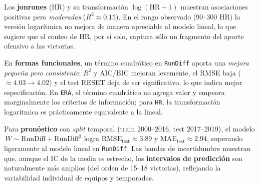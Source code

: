 \documentclass[man,floatsintext]{apa7}
\begin{document}
Los \textbf{jonrones} (HR) y su transformación \(\log(\text{HR}+1)\) muestran asociaciones positivas pero \textit{moderadas} (\(R^2\approx 0.15\)). En el rango observado (90–300 HR) la versión logarítmica no mejora de manera apreciable al modelo lineal, lo que sugiere que el conteo de HR, por sí solo, captura sólo un fragmento del aporte ofensivo a las victorias.

En \textbf{formas funcionales}, un término cuadrático en \texttt{RunDiff} aporta una \textit{mejora pequeña pero consistente}: \(R^2\) y AIC/BIC mejoran levemente, el RMSE baja (\(\approx 4.03 \rightarrow 4.02\)) y el test RESET deja de ser significativo, lo que indica mejor especificación. En \texttt{ERA}, el término cuadrático no agrega valor y empeora marginalmente los criterios de información; para \texttt{HR}, la transformación logarítmica es prácticamente equivalente a la lineal.

Para \textbf{pronóstico} con \textit{split} temporal (train 2000–2016, test 2017–2019), el modelo \(\,W \sim \text{RunDiff} + \text{RunDiff}^2\) logra \(\text{RMSE}_{\text{test}}\approx 3.89\) y \(\text{MAE}_{\text{test}}\approx 2.94\), superando ligeramente al modelo lineal en \texttt{RunDiff}. Las bandas de incertidumbre muestran que, aunque el IC de la media es estrecho, los \textbf{intervalos de predicción} son naturalmente más amplios (del orden de 15–18 victorias), reflejando la variabilidad individual de equipos y temporadas.
\end{document}

